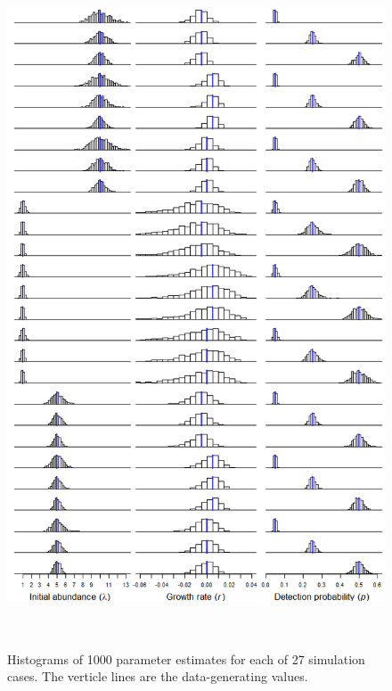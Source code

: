 \documentclass[12pt]{article}
\begin{document}
\newpage




\begin{figure}
  \centering
  \includegraphics[height=8in]{figs/exp_hists}
  \caption{Histograms of 1000 parameter estimates for each of 27
    simulation cases. The verticle lines are the data-generating
    values.}
\label{fig:exp_hists}
\end{figure}
\end{document}
